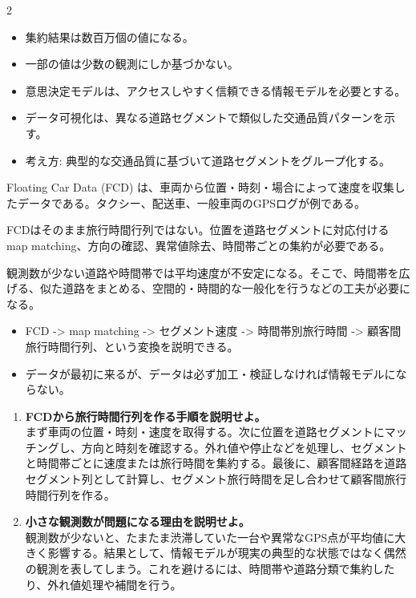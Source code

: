 \clearpage
{}
\begin{multicols}{2}\footnotesize\raggedcolumns
{}
\begin{itemize}
\item 集約結果は数百万個の値になる。
\item 一部の値は少数の観測にしか基づかない。
\item 意思決定モデルは、アクセスしやすく信頼できる情報モデルを必要とする。
\item データ可視化は、異なる道路セグメントで類似した交通品質パターンを示す。
\item 考え方: 典型的な交通品質に基づいて道路セグメントをグループ化する。
\end{itemize}
Floating Car Data (FCD) は、車両から位置・時刻・場合によって速度を収集したデータである。タクシー、配送車、一般車両のGPSログが例である。\par

FCDはそのまま旅行時間行列ではない。位置を道路セグメントに対応付ける map matching、方向の確認、異常値除去、時間帯ごとの集約が必要である。\par

観測数が少ない道路や時間帯では平均速度が不安定になる。そこで、時間帯を広げる、似た道路をまとめる、空間的・時間的な一般化を行うなどの工夫が必要になる。\par
{}
\begin{itemize}
\item FCD -> map matching -> セグメント速度 -> 時間帯別旅行時間 -> 顧客間旅行時間行列、という変換を説明できる。
\item データが最初に来るが、データは必ず加工・検証しなければ情報モデルにならない。
\end{itemize}
\begin{enumerate}
\item \textbf{FCDから旅行時間行列を作る手順を説明せよ。}\\まず車両の位置・時刻・速度を取得する。次に位置を道路セグメントにマッチングし、方向と時刻を確認する。外れ値や停止などを処理し、セグメントと時間帯ごとに速度または旅行時間を集約する。最後に、顧客間経路を道路セグメント列として計算し、セグメント旅行時間を足し合わせて顧客間旅行時間行列を作る。
\item \textbf{小さな観測数が問題になる理由を説明せよ。}\\観測数が少ないと、たまたま渋滞していた一台や異常なGPS点が平均値に大きく影響する。結果として、情報モデルが現実の典型的な状態ではなく偶然の観測を表してしまう。これを避けるには、時間帯や道路分類で集約したり、外れ値処理や補間を行う。
\end{enumerate}
\end{multicols}

